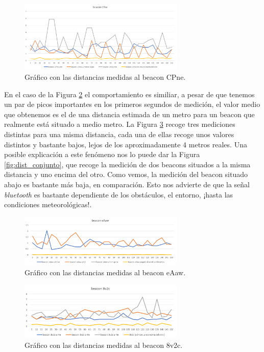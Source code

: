 \begin{figure}[t]
	\centering
	\includegraphics[width=0.7\textwidth]{Imagenes/Descripciondeltrabajo/dist_CPne}
	\caption{Gráfico con las distancias medidas al beacon CPne. }
	\label{fig:dist_CPne}
\end{figure}

En el caso de la Figura \ref{fig:dist_eAaw} el comportamiento es similiar, a pesar de que tenemos un par de picos importantes en los primeros segundos de medición, el valor medio que obtenemos es el de una distancia estimada de un metro para un beacon que realmente está situado a medio metro. La Figura \ref{fig:dist_8v2c} recoge tres mediciones distintas para una misma distancia, cada una de ellas recoge unos valores distintos y bastante bajos, lejos de los aproximadamente 4 metros reales. Una posible explicación a este fenómeno nos lo puede dar la Figura \ref{fig:dist_conjunto}, que recoge la medición de dos beacons situados a la misma distancia y uno encima del otro. Como vemos, la medición del beacon situado abajo es bastante más baja, en comparación. Esto nos advierte de que la señal \textit{bluetooth} es bastante dependiente de los obstáculos, el entorno, ¡hasta las condiciones meteorológicas!. 


\begin{figure}[t]
	\centering
	\includegraphics[width=0.7\textwidth]{Imagenes/Descripciondeltrabajo/dist_eAaw}
	\caption{Gráfico con las distancias medidas al beacon eAaw. }
	\label{fig:dist_eAaw}
\end{figure}


\begin{figure}[t]
	\centering
	\includegraphics[width=0.7\textwidth]{Imagenes/Descripciondeltrabajo/dist_8v2c}
	\caption{Gráfico con las distancias medidas al beacon 8v2c. }
	\label{fig:dist_8v2c}
\end{figure}


